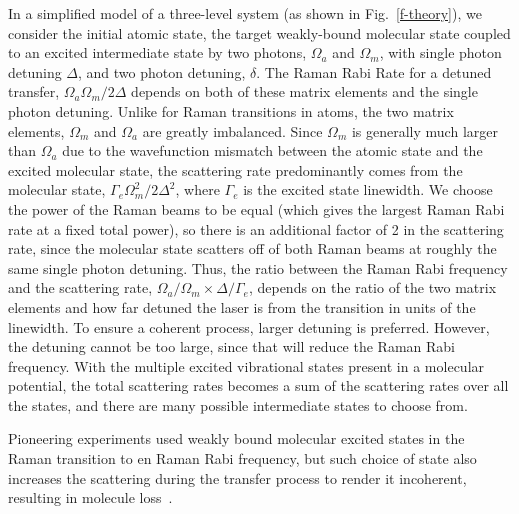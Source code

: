 \documentclass[aps,prl,twocolumn,groupedaddress]{revtex4-1}
\begin{document}
In a simplified model of a three-level system (as shown in Fig.~\ref{f-theory}), we consider the initial atomic state, the target weakly-bound molecular state coupled to an excited intermediate state by two photons, $\Omega_a$ and $\Omega_m$, with single photon detuning $ \Delta $, and two photon detuning, $ \delta$.  %
The Raman Rabi Rate for a detuned transfer, $ \Omega_a\Omega_m / 2\Delta$ depends on both of these matrix elements and the single photon detuning. Unlike for Raman transitions in atoms, the two matrix elements, $ \Omega_m$ and $ \Omega_a$ are greatly imbalanced. Since $ \Omega_m $ is generally much larger than $ \Omega_a $ due to the wavefunction mismatch between the atomic state and the excited molecular state, the scattering rate predominantly comes from the molecular state, $ \Gamma_e \Omega_m^2 / 2\Delta^2$, where $ \Gamma_e $ is the excited state linewidth. We choose the power of the Raman beams to be equal (which gives the largest Raman Rabi rate at a fixed total power), so there is an additional factor of 2 in the scattering rate, since the molecular state scatters off of both Raman beams at roughly the same single photon detuning. Thus, the ratio between the Raman Rabi frequency and the scattering rate, $ \Omega_a/\Omega_m \times \Delta/\Gamma_e $, depends on the ratio of the two matrix elements and how far detuned the laser is from the transition in units of the linewidth. To ensure a coherent process, larger detuning is preferred. However, the detuning cannot be too large, since that will reduce the Raman Rabi frequency. With the multiple excited vibrational states present in a molecular potential, the total scattering rates becomes a sum of the scattering rates over all the states, and there are many possible intermediate states to choose from. 

Pioneering experiments used weakly bound molecular excited states in the Raman transition to en Raman Rabi frequency, but such choice of state also increases the scattering during the transfer process to render it incoherent, resulting in molecule loss~\cite{Wynar2000,Rom2004}.
\end{document}
